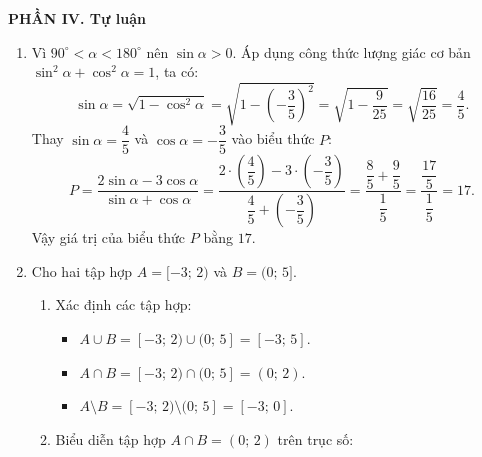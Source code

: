 \documentclass[12pt,a4paper]{article}
\begin{document}
\vspace{0.3cm}
\textbf{\large PHẦN IV. Tự luận}
\begin{enumerate}[label=\textbf{Câu \arabic*.},leftmargin=1.1cm]
\item 
Vì $90^\circ < \alpha < 180^\circ$ nên $\sin \alpha > 0$.
Áp dụng công thức lượng giác cơ bản $\sin^2 \alpha + \cos^2 \alpha = 1$, ta có:
\[
\sin \alpha = \sqrt{1 - \cos^2 \alpha} = \sqrt{1 - \left(-\dfrac{3}{5}\right)^2} = \sqrt{1 - \dfrac{9}{25}} = \sqrt{\dfrac{16}{25}} = \dfrac{4}{5}.
\]
Thay $\sin \alpha = \dfrac{4}{5}$ và $\cos \alpha = -\dfrac{3}{5}$ vào biểu thức $P$:
\[
P = \dfrac{2\sin \alpha - 3\cos \alpha}{\sin \alpha + \cos \alpha} = \dfrac{2 \cdot \left(\dfrac{4}{5}\right) - 3 \cdot \left(-\dfrac{3}{5}\right)}{\dfrac{4}{5} + \left(-\dfrac{3}{5}\right)} = \dfrac{\dfrac{8}{5} + \dfrac{9}{5}}{\dfrac{1}{5}} = \dfrac{\dfrac{17}{5}}{\dfrac{1}{5}} = 17.
\]
Vậy giá trị của biểu thức $P$ bằng $17$.

\item 
Cho hai tập hợp $A = [-3;\, 2)$ và $B = (0;\, 5]$.
\begin{enumerate}
    \item Xác định các tập hợp:
    \begin{itemize}
        \item $A \cup B = [-3;\, 2) \cup (0;\, 5] = [-3;\, 5]$.
        \item $A \cap B = [-3;\, 2) \cap (0;\, 5] = (0;\, 2)$.
        \item $A \setminus B = [-3;\, 2) \setminus (0;\, 5] = [-3;\, 0]$.
    \end{itemize}
    \item Biểu diễn tập hợp $A \cap B = (0;\, 2)$ trên trục số:
    \begin{center}
\end{center}
\end{enumerate}
\end{enumerate}
\end{document}
